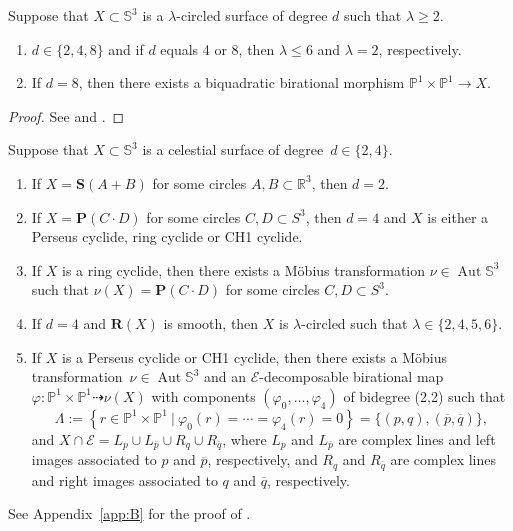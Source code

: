 \documentclass[11pt]{article}
\newenvironment{claims}{\begin{enumerate}[topsep=0pt,itemsep=0pt,leftmargin=8mm,label=\textnormal{\textbf{(\alph*)}},ref=(\alph*)]}{\end{enumerate}}
\newcommand{\R}{\mathbb{R}}
\renewcommand{\P}{\mathbb{P}}
\renewcommand{\S}{\mathbb{S}}
\newcommand{\bP}{\mathbf{P}}
\newcommand{\bR}{\mathbf{R}}
\newcommand{\bS}{\mathbf{S}}
\newcommand{\cE}{\mathcal{E}}
\newcommand{\op}{{\overline{p}}}
\newcommand{\oq}{{\overline{q}}}
\renewcommand{\c}{\colon}
\newcommand{\dto}{\dasharrow}
\newcommand{\aut}{\operatorname{Aut}}
\newcommand{\set}[2]{\left\{#1 ~|~ #2\right\}}
\newcommand{\resp}{respectively}
\newcommand{\st}{such that }
\begin{document}
\begin{theoremext}
\label{thm:A}
Suppose that $X\subset\S^3$ is a $\lambda$-circled surface
of degree $d$ \st $\lambda\geq 2$.
\begin{claims}
\item\label{thm:A:a}
$d\in\{2,4,8\}$ and if $d$ equals 4 or 8,
then $\lambda\leq 6$ and $\lambda=2$, \resp.
\item\label{thm:A:b}
If $d=8$, then there exists a biquadratic birational morphism $\P^1\times\P^1\to X$.
\end{claims}
\end{theoremext}

\begin{proof}
See \citep[Theorem~1]{2021circ} and \citep[Theorems~5 and 8]{2001}.
\end{proof}

\begin{theoremext}
\label{thm:B}
Suppose that $X\subset\S^3$ is a celestial surface of degree~$d\in\{2,4\}$.
\begin{claims}
\item\label{thm:B:a}
If $X=\bS(A+B)$ for some circles $A,B\subset\R^3$, then $d=2$.
\item\label{thm:B:b}
If $X=\bP(C\cdot D)$ for some circles $C,D\subset S^3$,
then $d=4$ and $X$ is either a Perseus cyclide, ring cyclide or CH1 cyclide.
\item\label{thm:B:c}
If $X$ is a ring cyclide, then there exists a M\"obius transformation $\nu\in\aut\S^3$
such that $\nu(X)=\bP(C\cdot D)$ for some circles $C,D\subset S^3$.
\item\label{thm:B:d}
If $d=4$ and $\bR(X)$ is smooth, then $X$ is $\lambda$-circled \st $\lambda\in\{2,4,5,6\}$.
\item\label{thm:B:e}
If $X$ is a Perseus cyclide or CH1 cyclide,
then there exists
a M\"obius transformation~$\nu\in\aut\S^3$ and
an $\cE$-decomposable birational map $\varphi\c\P^1\times\P^1\dto \nu(X)$
with components $(\varphi_0,\ldots,\varphi_4)$ of bidegree (2,2)
\st
\[
\Lambda:=\set{r\in\P^1\times\P^1}{\varphi_0(r)=\cdots=\varphi_4(r)=0}=\{(p,q),(\op,\oq)\},
\]
and
$X\cap\cE=L_p\cup L_\op\cup R_q\cup R_\oq$,
where
$L_p$ and $L_\op$ are complex lines and left images associated to $p$ and $\op$, \resp, and
$R_q$ and $R_\oq$ are complex lines and right images associated to $q$ and $\oq$, \resp.
\end{claims}
\end{theoremext}

See Appendix~\ref{app:B} for the proof of .
\end{document}
